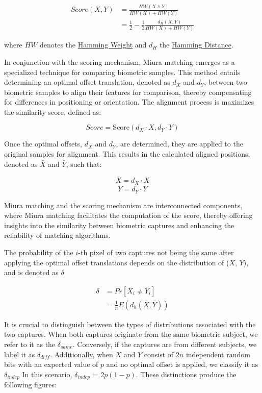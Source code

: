\begin{equation} \label{eq:score}
    \begin{aligned}
        Score(X, Y) &= \frac{HW(X \land Y)}{HW(X) + HW(Y)}\\
        &= \frac{1}{2}-\frac{1}{2}\frac{d_H(X, Y)}{HW(X) + HW(Y)}
    \end{aligned}
\end{equation}

where \(HW\) denotes the \hyperref[def:Hamming Weight]{Hamming Weight} and \(d_H\) the \hyperref[def:Hamming Distance]{Hamming Distance}. 

In conjunction with the scoring mechanism, Miura matching emerges as a specialized technique for comparing biometric samples. This method entails determining an optimal offset translation, denoted as \(d_X\) and \(d_Y\), between two biometric samples to align their features for comparison, thereby compensating for differences in positioning or orientation. The alignment process is maximizes the similarity score, defined as:

\[Score = \text{Score}(d_X \cdot X, d_Y \cdot Y)\]

Once the optimal offsets, \(d_X\) and \(d_Y\), are determined, they are applied to the original samples for alignment. This results in the calculated aligned positions, denoted as \(\bar{X}\) and \(\bar{Y}\), such that:

\[\bar{X} = d_X \cdot X\]
\[\bar{Y} = d_Y \cdot Y\]

Miura matching and the scoring mechanism are interconnected components, where Miura matching facilitates the computation of the score, thereby offering insights into the similarity between biometric captures and enhancing the reliability of matching algorithms.

The probability of the \(i\)-th pixel of two captures not being the same after applying the optimal offset translations depends on the distribution of (\(X\), \(Y\)), and is denoted as \(\delta\)

\begin{equation} \label{eq:delta}
    \begin{aligned}
        \delta &= Pr[\bar{X}_i \neq \bar{Y}_i]\\
        &= \frac{1}{n}E(d_h(\bar{X}, \bar{Y}))
    \end{aligned}
\end{equation}

It is crucial to distinguish between the types of distributions associated with the two captures. When both captures originate from the same biometric subject, we refer to it as the $\delta_{same}$. Conversely, if the captures are from different subjects, we label it as $\delta_{diff}$. Additionally, when \(X\) and \(Y\) consist of \(2n\) independent random bits with an expected value of \(p\) and no optimal offset is applied, we classify it as $\delta_{indep}$ In this scenario, \(\delta_{indep}\) = \(2p(1-p)\). These distinctions produce the following figures: 

